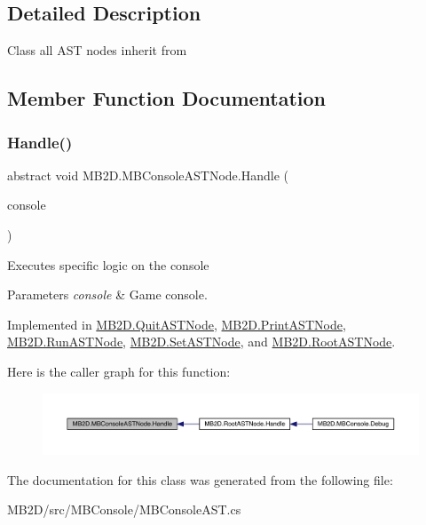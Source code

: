 \subsection{Detailed Description}
Class all A\+ST nodes inherit from 



\subsection{Member Function Documentation}
\hypertarget{class_m_b2_d_1_1_m_b_console_a_s_t_node_aa70a49e61ab623698af4ed8fda4ebbf5}{}\label{class_m_b2_d_1_1_m_b_console_a_s_t_node_aa70a49e61ab623698af4ed8fda4ebbf5} 
\subsubsection{\texorpdfstring{Handle()}{Handle()}}
{\footnotesize\ttfamily abstract void M\+B2\+D.\+M\+B\+Console\+A\+S\+T\+Node.\+Handle (\begin{DoxyParamCaption}\item[{\hyperlink{class_m_b2_d_1_1_m_b_console}{M\+B\+Console}}]{console }\end{DoxyParamCaption})\hspace{0.3cm}{\ttfamily [pure virtual]}}



Executes specific logic on the console 


\begin{DoxyParams}{Parameters}
{\em console} & Game console.\\
\hline
\end{DoxyParams}


Implemented in \hyperlink{class_m_b2_d_1_1_quit_a_s_t_node_a42a27d409a04151393bedcfff8ca5a3c}{M\+B2\+D.\+Quit\+A\+S\+T\+Node}, \hyperlink{class_m_b2_d_1_1_print_a_s_t_node_a61d2408e999df07c1190f6ba8bb6ad3f}{M\+B2\+D.\+Print\+A\+S\+T\+Node}, \hyperlink{class_m_b2_d_1_1_run_a_s_t_node_a20845d86608c81357f4347c29dcaf2c8}{M\+B2\+D.\+Run\+A\+S\+T\+Node}, \hyperlink{class_m_b2_d_1_1_set_a_s_t_node_a54eba248a545f6182c6a5509c4c1a6f2}{M\+B2\+D.\+Set\+A\+S\+T\+Node}, and \hyperlink{class_m_b2_d_1_1_root_a_s_t_node_a16290285c34db0660c0a8006fa182d0d}{M\+B2\+D.\+Root\+A\+S\+T\+Node}.

Here is the caller graph for this function\+:\nopagebreak
\begin{figure}[H]
\begin{center}
\leavevmode
\includegraphics[width=350pt]{class_m_b2_d_1_1_m_b_console_a_s_t_node_aa70a49e61ab623698af4ed8fda4ebbf5_icgraph}
\end{center}
\end{figure}


The documentation for this class was generated from the following file\+:\begin{DoxyCompactItemize}
\item 
M\+B2\+D/src/\+M\+B\+Console/M\+B\+Console\+A\+S\+T.\+cs\end{DoxyCompactItemize}
